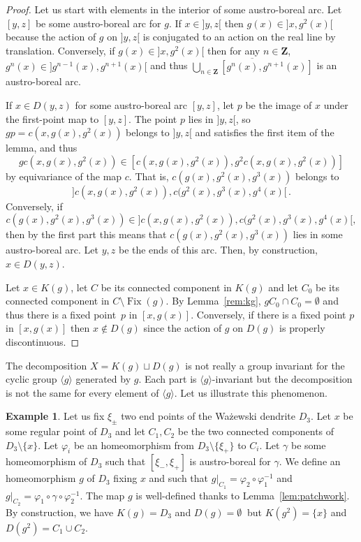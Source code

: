 \documentclass[JEP,XML,SOM,Unicode,NoFloatCountersInSection]{cedram}
\theoremstyle{plain}
\theoremstyle{definition}
\newtheorem{example}[thm]{Example}
\newcommand{\ZZ}{\mathbf{Z}}
\DeclareMathOperator{\Fix}{Fix}
\begin{document}
\begin{proof} Let us start with elements in the interior of some austro-boreal arc. Let $[y,z]$ be some austro-boreal arc for $g$. If $x\in{}]y,z[$ then $g(x)\in{}]x,g^2(x)[$ because the action of $g$ on $]y,z[$ is conjugated to an action on the real line by translation. Conversely, if $g(x)\in{}]x,g^2(x)[$ then for any $n\in\ZZ$, $g^n(x)\in{}]g^{n-1}(x),g^{n+1}(x)[$ and thus $\overline{\bigcup_{n\in\ZZ}[g^n(x),g^{n+1}(x)]}$ is an austro-boreal arc.

If $x\in D(y,z)$ for some austro-boreal arc $[y,z]$, let $p$ be the image of $x$ under the first-point map to $[y,z]$. The point $p$ lies in $]y,z[$, so  $gp=c(x,g(x),g^2(x))$ belongs to $]y,z[$ and satisfies the first item of the lemma, and thus
\[
gc(x,g(x),g^2(x))\in[c(x,g(x),g^2(x)),g^2c(x,g(x),g^2(x))]
\]
by equivariance of the map $c$. That is, $c(g(x),g^2(x),g^3(x))$ belongs to
\[
]c(x,g(x),g^2(x)),c(g^2(x),g^3(x),g^4(x)[\,.
\]
Conversely, if
\[
c(g(x),g^2(x),g^3(x))\in{}]c(x,g(x),g^2(x)),c(g^2(x),g^3(x),g^4(x)[,
\]
then by the first part this means that $c(g(x),g^2(x),g^3(x))$ lies in some austro-boreal arc. Let $y,z$ be the ends of this arc. Then, by construction, $x\in D(y,z)$.

Let $x\in K(g)$, let $C$ be its connected component in $K(g)$ and let $C_0$ be its connected component in $C\setminus\Fix(g)$. By Lemma~\ref{rem:kg}, $gC_0\cap C_0=\emptyset$ and thus there is a fixed point~$p$ in $[x,g(x)]$. Conversely, if there is a fixed point $p$ in $[x,g(x)]$ then $x\notin D(g)$ since the action of $g$ on $D(g)$ is properly discontinuous.
\end{proof}

The decomposition $X=K(g)\sqcup D(g)$ is not really a group invariant for the cyclic group $\langle g\rangle$ generated by $g$. Each part is $\langle g\rangle$-invariant but the decomposition is not the same for every element of $\langle g\rangle$. Let us illustrate this phenomenon.

\begin{example} Let us fix $\xi_\pm$ two end points of the Wa\.zewski dendrite $D_3$. Let $x$ be some regular point of $D_3$ and let $C_1,C_2$ be the two connected components of $D_3\setminus\{x\}$. Let $\varphi_i$ be an homeomorphism from $D_3\setminus\{\xi_+\}$ to $C_i$. Let $\gamma$ be some homeomorphism of $D_3$ such that $[\xi_-,\xi_+]$ is austro-boreal for $\gamma$. We define an homeomorphism $g$ of $D_3$ fixing $x$ and such that $g|_{C_1}=\varphi_2\circ\varphi_1^{-1}$ and $g|_{C_2}=\varphi_1\circ\gamma\circ\varphi_2^{-1}$. The map $g$ is well-defined thanks to Lemma~\ref{lem:patchwork}. By construction, we have $K(g)=D_3$ and $D(g)=\emptyset\ $ but $K(g^2)=\{x\}$ and $D(g^2)=C_1\cup C_2$. \end{example}
\end{document}
